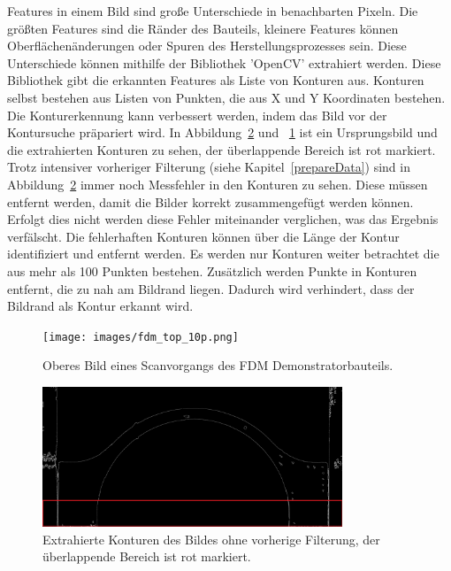 Features in einem Bild sind große Unterschiede in benachbarten Pixeln. Die größten
Features sind die Ränder des Bauteils, kleinere Features können Oberflächenänderungen 
oder Spuren des Herstellungsprozesses sein. Diese Unterschiede können mithilfe 
der Bibliothek 'OpenCV' extrahiert werden. Diese Bibliothek gibt die erkannten 
Features als Liste von Konturen aus. Konturen selbst bestehen aus Listen von 
Punkten, die aus X und Y Koordinaten bestehen. Die Konturerkennung kann verbessert 
werden, indem das Bild vor der Kontursuche präpariert wird. In Abbildung~\ref{fig:cons} und
~\ref{fig:image_top} ist ein Ursprungsbild und die extrahierten Konturen zu sehen, 
der überlappende Bereich ist rot markiert.
Trotz intensiver vorheriger Filterung (siehe Kapitel~\ref{prepareData}) sind in 
Abbildung~\ref{fig:cons} immer noch Messfehler in den Konturen zu sehen. 
Diese müssen entfernt werden, damit die Bilder 
korrekt zusammengefügt werden können. Erfolgt dies nicht werden diese Fehler miteinander
verglichen, was das Ergebnis verfälscht.
Die fehlerhaften Konturen können über die Länge der Kontur identifiziert und entfernt werden. 
Es werden nur Konturen weiter betrachtet die aus mehr als 100 Punkten bestehen. 
Zusätzlich werden Punkte in Konturen entfernt, die zu nah am Bildrand liegen. 
Dadurch wird verhindert, dass der Bildrand als Kontur erkannt wird.

\begin{figure}[h]
    \centering
    \texttt{[image: images/fdm\_top\_10p.png]} %
    \caption{Oberes Bild eines Scanvorgangs des FDM Demonstratorbauteils.}
    \label{fig:image_top}
\end{figure}

\begin{figure}[h]
    \centering
    \includegraphics[width=0.8\textwidth]{images/contours_of_image.png} %
    \caption{Extrahierte Konturen des Bildes ohne vorherige Filterung, 
    der überlappende Bereich ist rot markiert.}
    \label{fig:cons}
\end{figure}


